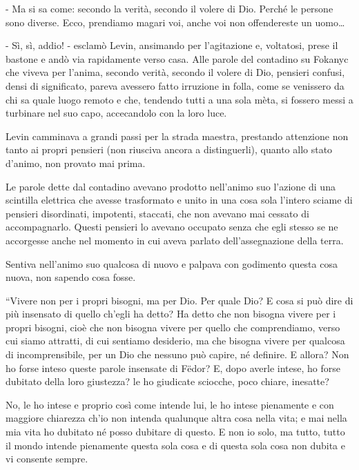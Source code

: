 - Ma si sa come: secondo la verità, secondo il volere di Dio. Perché le persone sono diverse. Ecco, prendiamo magari voi, anche voi non offendereste un uomo\ldots{} 

- Sì, sì, addio! - esclamò Levin, ansimando per l'agitazione e, voltatosi, prese il bastone e andò via rapidamente verso casa. Alle parole del contadino su Fokanyc che viveva per l'anima, secondo verità, secondo il volere di Dio, pensieri confusi, densi di significato, pareva avessero fatto irruzione in folla, come se venissero da chi sa quale luogo remoto e che, tendendo tutti a una sola mèta, si fossero messi a turbinare nel suo capo, accecandolo con la loro luce. 

\label{xii-7} 

Levin camminava a grandi passi per la strada maestra, prestando attenzione non tanto ai propri pensieri (non riusciva ancora a distinguerli), quanto allo stato d'animo, non provato mai prima. 

Le parole dette dal contadino avevano prodotto nell'animo suo l'azione di una scintilla elettrica che avesse trasformato e unito in una cosa sola l'intero sciame di pensieri disordinati, impotenti, staccati, che non avevano mai cessato di accompagnarlo. Questi pensieri lo avevano occupato senza che egli stesso se ne accorgesse anche nel momento in cui aveva parlato dell'assegnazione della terra. 

Sentiva nell'animo suo qualcosa di nuovo e palpava con godimento questa cosa nuova, non sapendo cosa fosse. 

``Vivere non per i propri bisogni, ma per Dio. Per quale Dio? E cosa si può dire di più insensato di quello ch'egli ha detto? Ha detto che non bisogna vivere per i propri bisogni, cioè che non bisogna vivere per quello che comprendiamo, verso cui siamo attratti, di cui sentiamo desiderio, ma che bisogna vivere per qualcosa di incomprensibile, per un Dio che nessuno può capire, né definire. E allora? Non ho forse inteso queste parole insensate di Fëdor? E, dopo averle intese, ho forse dubitato della loro giustezza? le ho giudicate sciocche, poco chiare, inesatte? 

No, le ho intese e proprio così come intende lui, le ho intese pienamente e con maggiore chiarezza ch'io non intenda qualunque altra cosa nella vita; e mai nella mia vita ho dubitato né posso dubitare di questo. E non io solo, ma tutto, tutto il mondo intende pienamente questa sola cosa e di questa sola cosa non dubita e vi consente sempre. 

